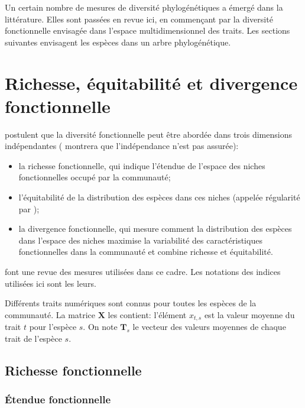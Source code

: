 \documentclass[
  11pt,
  french,
  a4paper,
  extrafontsizes,onecolumn,openright
  ]{memoir}
\providecommand{\tightlist}{%
  \setlength{\itemsep}{0pt}\setlength{\parskip}{0pt}}
\begin{document}
\normalsize

Un certain nombre de mesures de diversité phylogénétiques a émergé dans la littérature.
Elles sont passées en revue ici, en commençant par la diversité fonctionnelle envisagée dans l'espace multidimensionnel des traits.
Les sections suivantes envisagent les espèces dans un arbre phylogénétique.

\hypertarget{richesse-uxe9quitabilituxe9-et-divergence-fonctionnelle}{%
\section{Richesse, équitabilité et divergence fonctionnelle}\label{richesse-uxe9quitabilituxe9-et-divergence-fonctionnelle}}

\textcite{Mason2005} postulent que la diversité fonctionnelle peut être abordée dans trois dimensions indépendantes (\textcite{Jost2010} montrera que l'indépendance n'est pas assurée):

\begin{itemize}
\tightlist
\item
  la richesse fonctionnelle, qui indique l'étendue de l'espace des niches fonctionnelles occupé par la communauté;
\item
  l'équitabilité de la distribution des espèces dans ces niches (appelée régularité par \textcite{Pavoine2011});
\item
  la divergence fonctionnelle, qui mesure comment la distribution des espèces dans l'espace des niches maximise la variabilité des caractéristiques fonctionnelles dans la communauté et combine richesse et équitabilité.
\end{itemize}

\textcite{Schleuter2010} font une revue des mesures utilisées dans ce cadre.
Les notations des indices utilisées ici sont les leurs.

Différents traits numériques sont connus pour toutes les espèces de la communauté.
La matrice \(\mathbf{X}\) les contient: l'élément \(x_{t,s}\) est la valeur moyenne du trait \(t\) pour l'espèce \(s\).
On note \(\mathbf{T}_s\) le vecteur des valeurs moyennes de chaque trait de l'espèce \(s\).

\hypertarget{richesse-fonctionnelle}{%
\subsection{Richesse fonctionnelle}\label{richesse-fonctionnelle}}

\hypertarget{uxe9tendue-fonctionnelle}{%
\subsubsection{Étendue fonctionnelle}\label{uxe9tendue-fonctionnelle}}
\end{document}
